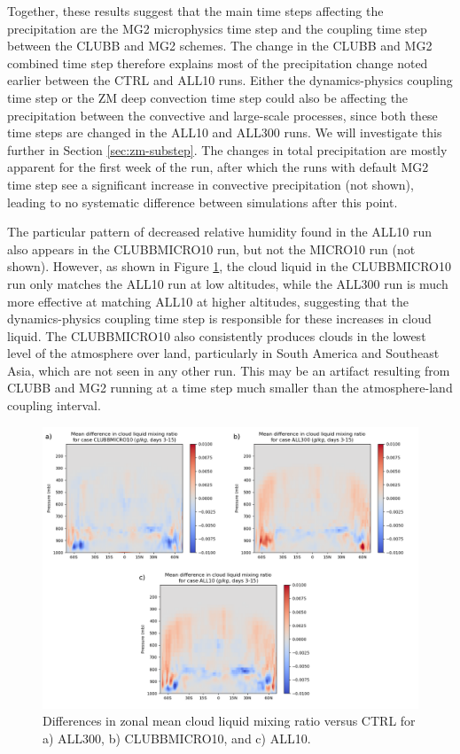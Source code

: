 \documentclass [11pt, proquest] {uwthesis}[2020/02/24]
\begin{document}
Together, these results suggest that the main time steps affecting the precipitation are the MG2 microphysics time step and the coupling time step between the CLUBB and MG2 schemes. The change in the CLUBB and MG2 combined time step therefore explains most of the precipitation change noted earlier between the CTRL and ALL10 runs. Either the dynamics-physics coupling time step or the ZM deep convection time step could also be affecting the precipitation between the convective and large-scale processes, since both these time steps are changed in the ALL10 and ALL300 runs. We will investigate this further in Section \ref{sec:zm-substep}. The changes in total precipitation are mostly apparent for the first week of the run, after which the runs with default MG2 time step see a significant increase in convective precipitation (not shown), leading to no systematic difference between simulations after this point.

The particular pattern of decreased relative humidity found in the ALL10 run also appears in the CLUBBMICRO10 run, but not the MICRO10 run (not shown). However, as shown in Figure \ref{fig:cldliq-map}, the cloud liquid in the CLUBBMICRO10 run only matches the ALL10 run at low altitudes, while the ALL300 run is much more effective at matching ALL10 at higher altitudes, suggesting that the dynamics-physics coupling time step is responsible for these increases in cloud liquid. The CLUBBMICRO10 also consistently produces clouds in the lowest level of the atmosphere over land, particularly in South America and Southeast Asia, which are not seen in any other run. This may be an artifact resulting from CLUBB and MG2 running at a time step much smaller than the atmosphere-land coupling interval.

\begin{figure}
    \centering
    \includegraphics[width=5.5in]{Figure9.png}
    \caption{Differences in zonal mean cloud liquid mixing ratio versus CTRL for a) ALL300, b) CLUBBMICRO10, and c) ALL10.}
    \label{fig:cldliq-map}
\end{figure}
\end{document}
